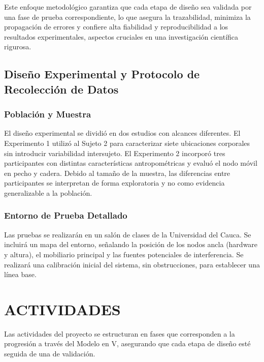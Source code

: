 Este enfoque metodológico garantiza que cada etapa de diseño sea validada por una fase de prueba correspondiente, lo que asegura la trazabilidad, minimiza la propagación de errores y confiere alta fiabilidad y reproducibilidad a los resultados experimentales, aspectos cruciales en una investigación científica rigurosa.



\subsection{Diseño Experimental y Protocolo de Recolección de Datos}

\subsubsection{Población y Muestra}

El diseño experimental se dividió en dos estudios con alcances diferentes. El Experimento 1 utilizó al Sujeto 2 para caracterizar siete ubicaciones corporales sin introducir variabilidad intersujeto. El Experimento 2 incorporó tres participantes con distintas características antropométricas y evaluó el nodo móvil en pecho y cadera. Debido al tamaño de la muestra, las diferencias entre participantes se interpretan de forma exploratoria y no como evidencia generalizable a la población.

\subsubsection{Entorno de Prueba Detallado}
Las pruebas se realizarán en un salón de clases de la Universidad del Cauca. Se incluirá un mapa del entorno, señalando la posición de los nodos ancla (hardware y altura), el mobiliario principal y las fuentes potenciales de interferencia. Se realizará una calibración inicial del sistema, sin obstrucciones, para establecer una línea base.

\section{ACTIVIDADES}
\label{sec:actividades}

Las actividades del proyecto se estructuran en fases que corresponden a la progresión a través del Modelo en V, asegurando que cada etapa de diseño esté seguida de una de validación.

